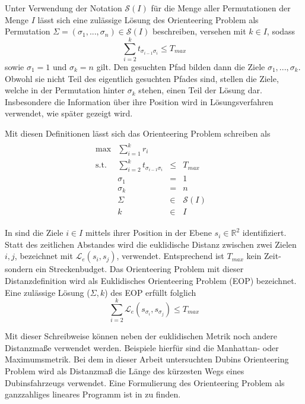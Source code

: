 \documentclass[12pt,a4paper,twoside]{article}
\theoremstyle{definition}
\numberwithin{equation}{section}
\begin{document}
Unter Verwendung der Notation $\mathcal{S}(I)$ für die Menge aller Permutationen der Menge $I$ lässt sich eine zulässige Lösung des Orienteering Problem als Permutation $\Sigma = (\sigma_1,...,\sigma_n) \in \mathcal{S}(I)$ beschreiben, versehen mit $k \in I$, sodass
\begin{equation}
	\sum_{i = 2}^{k} t_{\sigma_{i-1}\sigma_{i}} \leq T_{max}
\end{equation}
sowie $\sigma_1 = 1$ und $\sigma_k = n$ gilt. Den gesuchten Pfad bilden dann die Ziele $\sigma_1,...,\sigma_k$. Obwohl sie nicht Teil des eigentlich gesuchten Pfades sind, stellen die Ziele, welche in der Permutation hinter $\sigma_k$ stehen, einen Teil der Lösung dar. Insbesondere die Information über ihre Position wird in Lösungsverfahren verwendet, wie später gezeigt wird.

Mit diesen Definitionen lässt sich das Orienteering Problem schreiben als
\begin{align}
	\begin{array}{llcll}
		\text{max}  & \sum_{i=1}^{k} r_{i}        &      &             & \\
		\text{s.t.} & \sum_{i = 2}^{k} t_{\sigma_{i-1}\sigma_{i}}    & \leq    &  T_{max}         &  \\
		& \sigma_1 & = & 1 & \\
		& \sigma_k & = & n     &\\
		& \Sigma & \in & \mathcal{S}(I) & \\
		& k & \in & I & 
	\end{array}
	\tag{OP}
	\label{OP}
\end{align}

In \cite{R.Penicka.2017} sind die Ziele $i \in I$ mittels ihrer Position in der Ebene $s_i \in \mathbb{R}^2$ identifiziert. Statt des zeitlichen Abstandes wird die euklidische Distanz zwischen zwei Zielen $i,j$, bezeichnet mit $\mathcal{L}_{e}(s_i,s_j)$, verwendet. Entsprechend ist $T_{max}$ kein Zeit- sondern ein Streckenbudget. Das Orienteering Problem mit dieser Distanzdefinition wird als Euklidisches Orienteering Problem (EOP) bezeichnet. Eine zulässige Lösung ($\Sigma,k$) des EOP erfüllt folglich
\begin{equation}
	\sum_{i = 2}^k \mathcal{L}_{e}(s_{\sigma_i},s_{\sigma_j}) \leq T_{max}
\end{equation}

Mit dieser Schreibweise können neben der euklidischen Metrik noch andere Distanzmaße verwendet werden. Beispiele hierfür sind die Manhattan- oder Maximumsmetrik. Bei dem in dieser Arbeit untersuchten Dubins Orienteering Problem wird als Distanzmaß die Länge des kürzesten Wegs eines Dubinsfahrzeugs verwendet.
Eine Formulierung des Orienteering Problem als ganzzahliges lineares Programm ist in \cite{Vansteenwegen.2019} zu finden.
\end{document}
